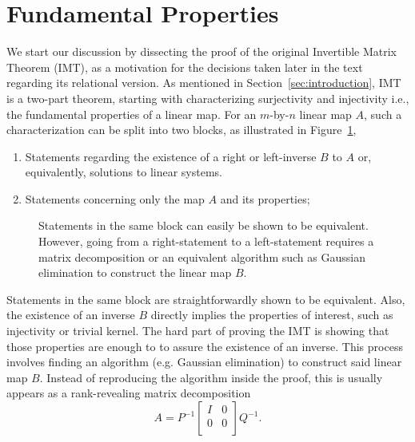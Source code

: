 \documentclass[manyauthors]{fundam}
\begin{document}
\section{Fundamental Properties}\label{sec:fundamental_properties}

We start our discussion by dissecting the proof of
the original Invertible Matrix Theorem (IMT),
as a motivation for the decisions taken later in the text regarding its relational version.
As mentioned in Section~\ref{sec:introduction},
IMT is a two-part theorem, starting with characterizing surjectivity and injectivity
i.e., the fundamental properties of a linear map.
For an $m$-by-$n$ linear map $A$,
such a characterization can be split into two blocks,
as illustrated in Figure~\ref{fig:imt-graph},
\begin{enumerate}
  \item Statements regarding the existence of a right or left-inverse $B$ to $A$ or, equivalently, solutions to linear systems.
  \item Statements concerning only the map $A$ and its properties;
\end{enumerate}

\begin{figure}[h]
    \centering
    \caption{Statements in the same block can easily be shown to be equivalent. However, going from a right-statement to a left-statement requires a matrix decomposition or an equivalent algorithm such as Gaussian elimination to construct the linear map $B$.}
    \label{fig:imt-graph}
\end{figure}

Statements in the same block are straightforwardly shown to be equivalent.
Also, the existence of an inverse $B$ directly implies the properties of interest,
such as injectivity or trivial kernel.
The hard part of proving the IMT is showing that those properties are enough to to assure the existence of an inverse.
This process involves finding an algorithm (e.g. Gaussian elimination)
to construct said linear map $B$.
Instead of reproducing the algorithm inside the proof,
this is usually appears as a rank-revealing matrix decomposition
\[
  \label{eq:functional_canonical_decomposition}
  A = P^{-1}\begin{bmatrix} I & 0 \\ 0 & 0 \\\end{bmatrix} Q^{-1}.
\]
\end{document}
